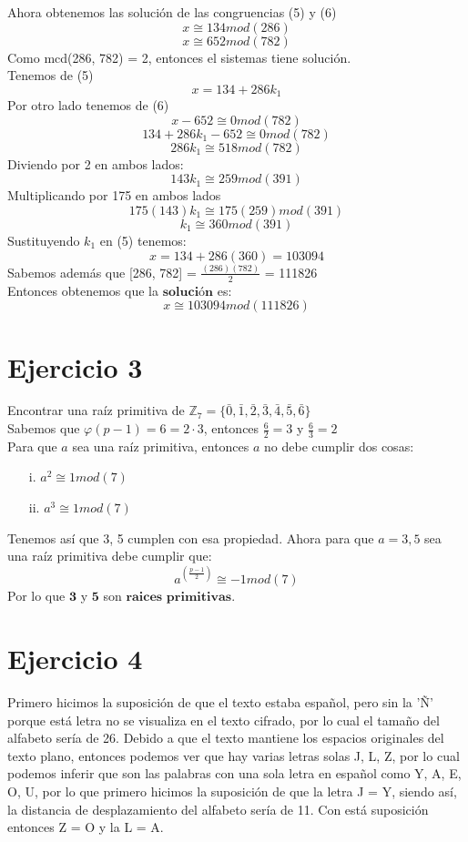 \documentclass[12pt, letterpaper]{article}
\begin{document}
Ahora obtenemos las solución de las congruencias (5) y (6)
 $$x \cong 134 mod (286)$$
 $$x \cong 652 mod (782)$$
Como mcd(286, 782) = 2, entonces el sistemas tiene solución.\\
Tenemos de (5) $$x = 134 + 286k_1$$
Por otro lado tenemos de (6)
$$x - 652 \cong 0 mod (782)$$
$$134 + 286k_1 -652 \cong 0 mod (782)$$
$$286k_1 \cong 518 mod (782)$$
Diviendo por 2 en ambos lados:
$$143k_1 \cong 259 mod (391)$$
Multiplicando por 175 en ambos lados
$$175(143)k_1 \cong 175(259) mod (391)$$
$$k_1 \cong 360 mod (391)$$
Sustituyendo $k_1$ en (5) tenemos:
$$x = 134 + 286(360) = 103094$$
Sabemos además que [286, 782] = $\frac{(286)(782)}{2}$ = 111826\\
Entonces obtenemos que la $\textbf{solución}$ es:
\begin{equation}
x \cong 103094 mod (111826)
\end{equation}


\section*{Ejercicio 3}
Encontrar una raíz primitiva de $\mathbb{Z}_7 = \{\bar{0},\bar{1},\bar{2},\bar{3},\bar{4},\bar{5},\bar{6}\}$\\
Sabemos que $\varphi(p-1) = 6 = 2\cdot3$, entonces $\frac{6}{2} = 3$ y $\frac{6}{3} = 2$\\
Para que $a$ sea una raíz primitiva, entonces $a$ no debe cumplir dos cosas:
\begin{itemize}
\item[i.]$a^2 \cong 1 mod(7)$
\item[ii.]$a^3 \cong 1 mod(7)$
\end{itemize}
Tenemos así que {3, 5} cumplen con esa propiedad. Ahora para que $a = {3, 5}$ sea una raíz primitiva debe cumplir que:\\
$$a^{(\frac{p-1}{2})} \cong -1 mod (7)$$
Por lo que $\textbf{3}$ y $\textbf{5}$ son $\textbf{raices primitivas}$.

\section*{Ejercicio 4}
Primero hicimos la suposición de que el texto estaba español, pero sin la 'Ñ' porque está letra no se visualiza en el texto cifrado, por lo cual el tamaño del alfabeto sería de 26. Debido a que el texto mantiene los espacios originales del texto plano, entonces podemos ver que hay varias letras solas J, L, Z, por lo cual podemos inferir que son las palabras con una sola letra en español como Y, A, E, O, U, por lo que primero hicimos la suposición de que la letra J = Y, siendo así, la distancia de desplazamiento del alfabeto sería de 11. Con está suposición entonces Z = O y la L = A.\\
\end{document}
